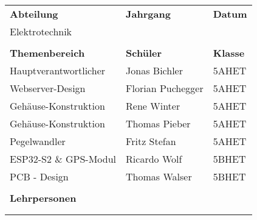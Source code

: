 \begin{titlingpage}
	\renewcommand{\arraystretch}{1.5}
	\begin{table}[H]
		\begin{tabular}{p{6cm} p{5cm} p{3.75cm}}
			\textbf{Abteilung}     & \textbf{Jahrgang} & \hspace{1cm} \textbf{Datum}  \\
			Elektrotechnik         & \iYear            & \hspace{1cm} \iDate          \\
			                       &                   &                              \\
			\textbf{Themenbereich} & \textbf{Schüler}  & \hspace{1cm} \textbf{Klasse} \\
			Hauptverantwortlicher  & Jonas Bichler     & \hspace{1cm} 5AHET           \\
			Webserver-Design       & Florian Puchegger & \hspace{1cm} 5AHET           \\
			Gehäuse-Konstruktion   & Rene Winter       & \hspace{1cm} 5AHET           \\
			Gehäuse-Konstruktion   & Thomas Pieber     & \hspace{1cm} 5AHET           \\
			Pegelwandler           & Fritz Stefan      & \hspace{1cm} 5AHET           \\
			ESP32-S2 \& GPS-Modul  & Ricardo Wolf      & \hspace{1cm} 5BHET           \\
			PCB - Design           & Thomas Walser     & \hspace{1cm} 5BHET           \\
			                       &                   &                              \\
			\textbf{Lehrpersonen}  &                   &                              \\
			\multicolumn{3}{l}{\iCoachOne}                                            \\
			\multicolumn{3}{l}{\iCoachTwo}
		\end{tabular}
	\renewcommand{\arraystretch}{1}
	\end{table}
\end{titlingpage}

\newpage
\tableofcontents
\newpage


